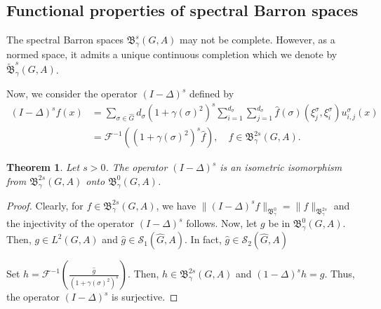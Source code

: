 \documentclass[12pt]{amsart}%
\newtheorem{theorem}{Theorem}[section]
\begin{document}
\subsection{Functional properties of spectral Barron spaces}
The spectral Barron spaces $\mathfrak{B}^s_\gamma (G, A)$ may not be complete. However, as a normed space, it admits a unique continuous completion which we denote by  $\tilde{\mathfrak{B}}^s_\gamma (G, A)$.




Now, we consider the operator $(I-\Delta)^s$ defined by 
\begin{eqnarray}
(I-\Delta)^sf(x)&=\sum\limits_{\sigma\in \widehat{G}}d_\sigma  (1+\gamma(\sigma)^2)^s\sum\limits_{i=1}^{d_\sigma}\sum\limits_{j=1}^{d_\sigma}\widehat{f}(\sigma)(\xi_j^\sigma, \xi_i^\sigma)u_{i,j}^\sigma (x)\\
&=\mathscr{F}^{-1}((1+\gamma(\sigma)^2)^s\widehat{f}
), \quad f\in  \mathfrak{B}^{2s}_\gamma (G, A).
\end{eqnarray}

\begin{theorem}\label{isomorphism}
Let $s>0$. The operator $(I-\Delta)^s$ is an isometric isomorphism from $\mathfrak{B}^{2s}_\gamma (G, A)$ onto $\mathfrak{B}^{0}_\gamma (G, A)$.
\end{theorem}
\begin{proof}
Clearly, for $f\in \mathfrak{B}^{2s}_\gamma (G, A)$, we have 
$\|(I-\Delta)^sf\|_{\mathfrak{B}^0_\gamma}=\|f\|_{\mathfrak{B}^{2s}_\gamma}$  and the injectivity of the operator $(I-\Delta)^s$ follows. 
Now, let $g$ be in $\mathfrak{B}^0_\gamma (G,A)$. Then, $g\in L^2(G,A)$ and $\widehat{g}\in \mathscr{S}_1(\widehat{G}, A)$.  In fact, $\widehat{g}\in \mathscr{S}_2(\widehat{G}, A)$


 Set $h=\mathscr{F}^{-1}\left(\displaystyle\frac{\widehat{g}}{(1+\gamma(\sigma)^2)^s}\right)$. Then, $h\in \mathfrak{B}^{2s}_\gamma (G, A)$ and  $(1-\Delta)^sh=g$. Thus, the operator $(I-\Delta)^s$ is surjective. 
\end{proof}
\end{document}
